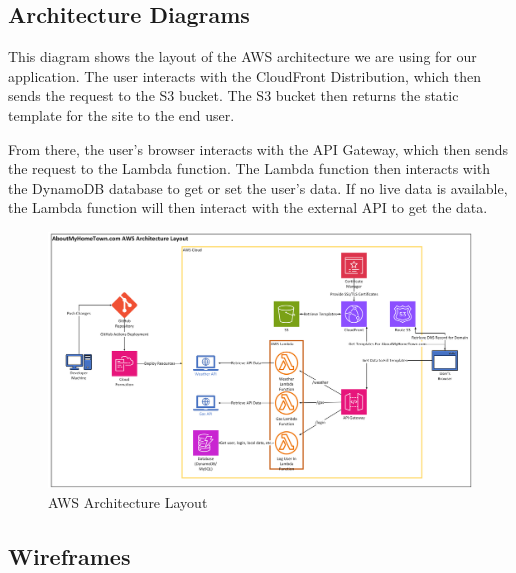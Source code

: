 \documentclass[12pt]{article}
\begin{document}
\subsection{Architecture Diagrams}

This diagram shows the layout of the AWS architecture we are using for our application. The user interacts with the CloudFront Distribution, which then sends the request to the S3 bucket. The S3 bucket then returns the static template for the site to the end user.

From there, the user's browser interacts with the API Gateway, which then sends the request to the Lambda function. The Lambda function then interacts with the DynamoDB database to get or set the user's data. If no live data is available, the Lambda function will then interact with the external API to get the data.

\begin{figure}[htbp]
    \centering
    \includegraphics[width=\textwidth]{images/aws_architecture_layout.png}
    \caption{AWS Architecture Layout}
    \label{fig:architecture}
\end{figure}

\subsection{Wireframes}
\end{document}

